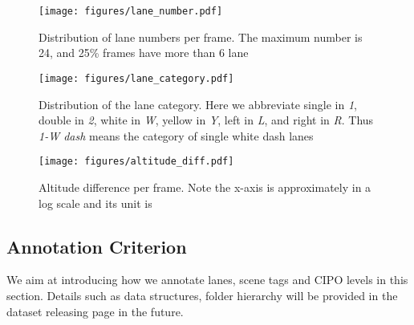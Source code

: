 \documentclass[runningheads]{llncs}
\begin{document}
\begin{figure}[t!]
    \centering
\texttt{[image: figures/lane\_number.pdf]}
\vspace{-.2cm}
      \caption{Distribution of lane numbers per frame. The maximum number is 24, and 25\% frames have more than 6 lane}
    \label{fig: stat - number}
\end{figure}

\begin{figure}[t!]
    \centering
\texttt{[image: figures/lane\_category.pdf]}
\vspace{-.2cm}
      \caption{Distribution of the lane category. Here we abbreviate single in \textit{1}, double in \textit{2}, white in \textit{W}, yellow in \textit{Y}, left in \textit{L}, and right in \textit{R}. Thus \textit{1-W dash} means the category of single white dash lanes}
    \label{fig: stat - type}
\end{figure}

\begin{figure}[t!]
    \centering
\texttt{[image: figures/altitude\_diff.pdf]}
\vspace{-.2cm}
      \caption{Altitude difference per frame. Note the x-axis is approximately in a log scale and its unit is }
    \label{fig: stat - height}
\end{figure}


\subsection{Annotation Criterion}

We aim at introducing how we annotate lanes, scene tags and CIPO levels in this section. Details such as data structures, folder hierarchy will be provided in the dataset releasing page in the future.
\end{document}
